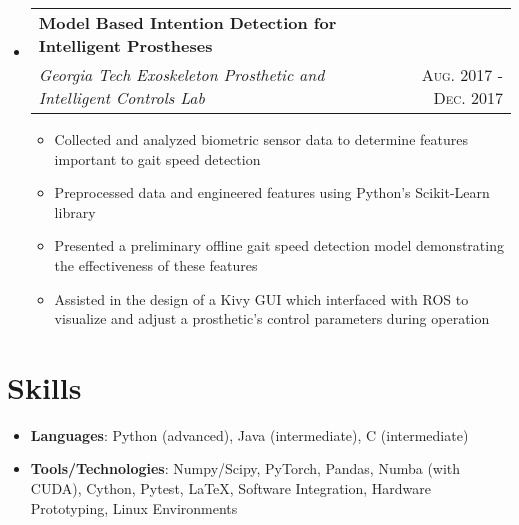 \documentclass[letterpaper,11pt]{article}
\makeatletter
\newcommand{\resumeItem}[2]{
  \item\small{
    \textbf{#1}{: #2 \vspace{-2pt}}
  }
}
\newcommand{\resumePlainItem}[1]{
  \item\small{#1 \vspace{-2pt}}
}
\newcommand{\resumeSubheading}[4]{
  \vspace{-1pt}\item[]
    \begin{tabular*}{0.97\textwidth}{l@{\extracolsep{\fill}}r}
      \textbf{#1} & #2 \\
      \textit{\small#3} & \textsc{\small #4} \\ %
    \end{tabular*}\vspace{-5pt}
}
\newcommand{\resumeSubHeadingListStart}{\begin{itemize}[leftmargin=*]}
\newcommand{\resumeSubHeadingListEnd}{\end{itemize}}
\newcommand{\resumeItemListStart}{\begin{itemize}}
\newcommand{\resumeItemListEnd}{\end{itemize}\vspace{-5pt}}
\newenvironment{resumeItemList}{\resumeItemListStart}{\resumeItemListEnd}
\newenvironment{resumeSubheadingList}{\resumeSubHeadingListStart}{\resumeSubHeadingListEnd}
\makeatother
\begin{document}
\begin{resumeSubheadingList}
    \resumeSubheading
    {Model Based Intention Detection for Intelligent Prostheses}{}
    {Georgia Tech Exoskeleton Prosthetic and Intelligent Controls Lab}{Aug. 2017 - Dec. 2017}
    \begin{resumeItemList}
      \resumePlainItem{Collected and analyzed biometric sensor data to determine features important to gait
      speed detection}
      \resumePlainItem{Preprocessed data and engineered features using Python's Scikit-Learn library} %
      \resumePlainItem{Presented a preliminary offline gait speed detection model demonstrating the effectiveness of these features}
      \resumePlainItem{Assisted in the design of a Kivy GUI which interfaced with ROS to visualize and adjust a prosthetic's control
      parameters during operation}
    \end{resumeItemList}
  \end{resumeSubheadingList}

\section{Skills}
  \begin{resumeItemList}
    \resumeItem{Languages}{Python (advanced), Java (intermediate), C (intermediate)}
    \resumeItem{Tools/Technologies}{Numpy/Scipy, PyTorch, Pandas, Numba (with CUDA), Cython, Pytest, \LaTeX,
                                    Software Integration, Hardware Prototyping, Linux Environments} %
  \end{resumeItemList}
\end{document}
